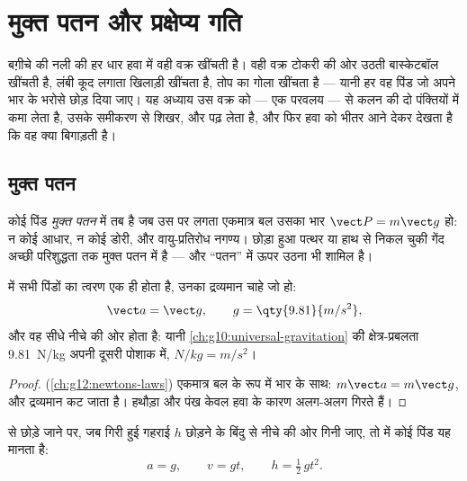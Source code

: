 \chapter{मुक्त पतन और प्रक्षेप्य गति}\label{ch:g12:projectile-motion}

बग़ीचे की नली की हर धार हवा में वही वक्र खींचती है। वही वक्र टोकरी की ओर उठती
बास्केटबॉल खींचती है, लंबी कूद लगाता खिलाड़ी खींचता है, तोप का गोला खींचता है
--- यानी हर वह पिंड जो अपने भार के भरोसे छोड़ दिया जाए। यह अध्याय उस
वक्र को --- एक परवलय ---  से कलन की दो पंक्तियों में
कमा लेता है, उसके समीकरण से शिखर,  और  पढ़ लेता है, और फिर
हवा को भीतर आने देकर देखता है कि वह क्या बिगाड़ती है।

\section{मुक्त पतन}

\begin{definition}[मुक्त पतन]\label{def:g12:projectile-motion:freefall}
कोई पिंड \emph{मुक्त पतन} में तब है जब उस पर लगता एकमात्र
बल उसका भार $\vect P = m\vect g$ हो: न कोई आधार, न कोई डोरी, और वायु-प्रतिरोध
नगण्य। छोड़ा हुआ पत्थर या हाथ से निकल चुकी गेंद अच्छी परिशुद्धता तक मुक्त पतन
में है --- और ``पतन'' में ऊपर उठना भी शामिल है।
\end{definition}

\begin{theorem}[गैलीलियो का मुक्त पतन का नियम]\label{thm:g12:projectile-motion:galileo}
 में सभी पिंडों का त्वरण एक ही होता है, उनका द्रव्यमान चाहे जो
हो:
\[
\vect a = \vect g, \qquad g = \qty{9.81}{m/s^2},
\]
और वह सीधे नीचे की ओर होता है: यानी \cref{ch:g10:universal-gravitation} की क्षेत्र-प्रबलता \qty{9.81}{N/kg}
अपनी दूसरी पोशाक में, $\unit{N/kg} = \unit{m/s^2}$।
\end{theorem}

\begin{proof}
 (\cref{ch:g12:newtons-laws}) एकमात्र बल के रूप में
भार के साथ: $m\vect a = m\vect g$, और द्रव्यमान कट जाता है। हथौड़ा और पंख केवल हवा के
कारण अलग-अलग गिरते हैं।
\end{proof}

\begin{proposition}[विराम से ऊर्ध्वाधर पतन]\label{prop:g12:projectile-motion:vertical}
 से छोड़े जाने पर, जब गिरी हुई गहराई $h$ छोड़ने के बिंदु से नीचे की ओर
गिनी जाए, तो  में कोई पिंड यह मानता है:
\[
a = g, \qquad v = g t, \qquad h = \tfrac12\, g t^2 .
\]
\end{proposition}

